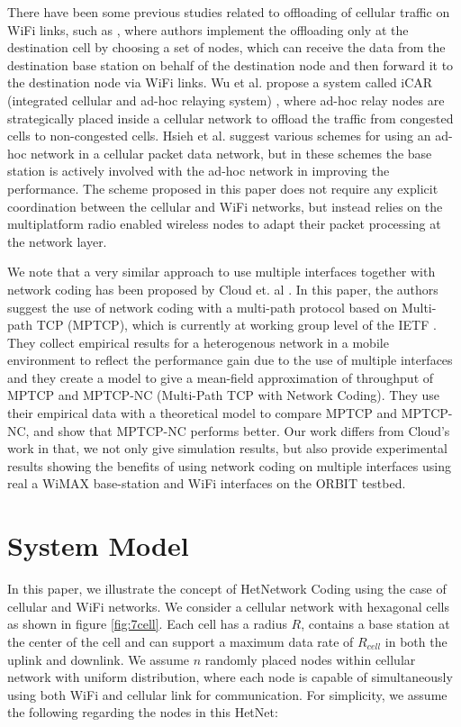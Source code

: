 \documentclass{sig-alternate-10pt}
\begin{document}
There have been some previous studies related to offloading of cellular traffic on WiFi links, such as  \cite{dhh11}, \cite{lmrs07} where authors implement the offloading only at the destination cell by choosing a set of nodes, which can receive the data from the destination base station on behalf of the destination node and then forward it to the destination node via WiFi links. Wu et al. propose a system called iCAR (integrated cellular and ad-hoc relaying system) \cite{Wu01integratedcellular}, where ad-hoc relay nodes are strategically placed inside a cellular network to offload the traffic from congested cells to non-congested cells.  Hsieh et al. \cite{Hsieh:2002:UAN:513800.513805} suggest various schemes for using an ad-hoc network in a cellular packet data network, but in these schemes the base station is actively involved with the ad-hoc network in improving the performance. The scheme proposed in this paper does not require any explicit coordination between the cellular and WiFi networks, but instead relies on the multiplatform radio enabled wireless nodes to adapt their packet processing at the network layer.

We note that a very similar approach  to use multiple interfaces together with network coding has been proposed by Cloud et. al \cite{cloud13multitcp}. In this paper, the authors suggest the use of   network coding with a multi-path protocol based on Multi-path TCP (MPTCP), which is  currently at working group level of the IETF \cite{ietfmptcp}.  They  collect empirical  results for a heterogenous network in a mobile environment to reflect the performance gain due to the use of multiple interfaces and they create a model to give a mean-field approximation of throughput of MPTCP and MPTCP-NC (Multi-Path TCP with Network Coding). They use their empirical data with a theoretical model to compare MPTCP and MPTCP-NC, and show that MPTCP-NC performs better. Our work differs from Cloud's work in that, we not only give simulation results, but also provide experimental results showing  the benefits of  using network coding on multiple interfaces using real a WiMAX base-station and WiFi interfaces on the ORBIT testbed.




\section{System Model}
In this paper, we illustrate the concept of HetNetwork Coding using the case of cellular and WiFi networks. We consider a cellular network with hexagonal cells  as shown in figure \ref{fig:7cell}.  Each cell  has a radius  $R$,  contains a base station at the center of the cell and can support a maximum data  rate of  $R_{cell}$ in both the uplink and downlink. We assume $n$ randomly placed nodes  within cellular network with uniform distribution, where each node is capable of simultaneously using both WiFi and cellular link for communication. For simplicity, we assume the following regarding the nodes in this HetNet:
\end{document}

